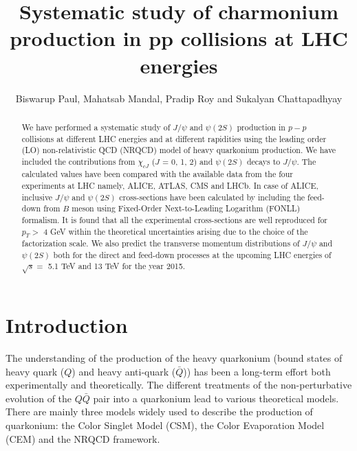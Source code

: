 \documentclass{iopart}
\begin{document}
\title[]{Systematic study of charmonium production in pp collisions at LHC energies}

\author{Biswarup Paul, Mahatsab Mandal, Pradip Roy and Sukalyan Chattapadhyay}

\address{High Energy Nuclear and Particle Physics Division, Saha Institute
of Nuclear Physics,
1/AF Bidhannagar, Kolkata-700 064, INDIA}

\begin{abstract}
We have performed a systematic study of $J/\psi$ and $\psi(2S)$ production in $p-p$ collisions at different LHC energies and at different rapidities using the leading order (LO) non-relativistic QCD (NRQCD) model of heavy quarkonium production. We have included the contributions from $\chi_{cJ}$ ($J$ = 0, 1, 2) and $\psi(2S)$ decays to $J/\psi$. The calculated values have been compared with the available data from the four experiments at LHC namely, ALICE, ATLAS, CMS and LHCb. In case of ALICE, inclusive $J/\psi$ and $\psi(2S)$ cross-sections have been calculated by including the feed-down from $B$ meson using Fixed-Order Next-to-Leading Logarithm (FONLL) formalism. It is found that all the experimental cross-sections are well reproduced for $p_T >$ 4 GeV within the theoretical uncertainties arising due to the choice of the factorization scale. We also predict the transverse momentum distributions of $J/\psi$ and $\psi(2S)$ both for the direct and feed-down processes at the upcoming LHC energies of $\sqrt{s} =$ 5.1 TeV and 13 TeV for the year 2015.

\end{abstract}


\maketitle
\section{Introduction}
The understanding of the production of the heavy quarkonium (bound states of heavy quark ($Q$) and heavy anti-quark ($\bar Q$)) has been a long-term effort both experimentally and theoretically. The different treatments of the non-perturbative evolution of the $Q \bar Q$ pair into a quarkonium lead to various theoretical models. There are mainly three models widely used to describe the production of quarkonium: the Color Singlet Model (CSM), the Color Evaporation Model (CEM) and the NRQCD framework. 
\end{document}

